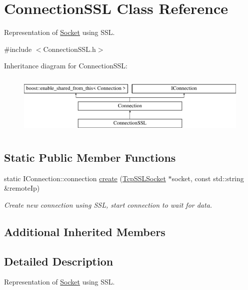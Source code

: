 \hypertarget{class_connection_s_s_l}{\section{Connection\-S\-S\-L Class Reference}
\label{class_connection_s_s_l}
}


Representation of \hyperlink{class_socket}{Socket} using S\-S\-L.  




{\ttfamily \#include $<$Connection\-S\-S\-L.\-h$>$}

Inheritance diagram for Connection\-S\-S\-L\-:\begin{figure}[H]
\begin{center}
\leavevmode
\includegraphics[height=2.937063cm]{class_connection_s_s_l}
\end{center}
\end{figure}
\subsection*{Static Public Member Functions}
\begin{DoxyCompactItemize}
\item 
static I\-Connection\-::connection \hyperlink{class_connection_s_s_l_a1c9286c4501c70c92cad1a52d5bc2241}{create} (\hyperlink{class_tcp_s_s_l_socket}{Tcp\-S\-S\-L\-Socket} $\ast$socket, const std\-::string \&remote\-Ip)
\begin{DoxyCompactList}\small\item\em Create new connection using S\-S\-L, start connection to wait for data. \end{DoxyCompactList}\end{DoxyCompactItemize}
\subsection*{Additional Inherited Members}


\subsection{Detailed Description}
Representation of \hyperlink{class_socket}{Socket} using S\-S\-L. 

